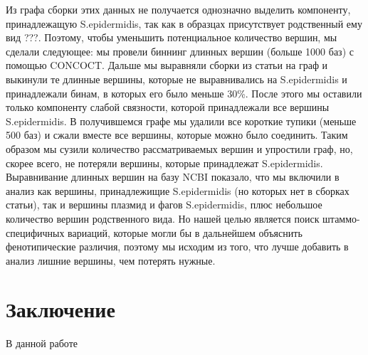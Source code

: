 \documentclass{spbau-diploma}
\begin{document}
Из графа сборки этих данных не получается однозначно выделить компоненту, принадлежащую S.epidermidis, так как в образцах присутствует родственный ему вид ???. Поэтому, чтобы уменьшить потенциальное количество вершин, мы сделали следующее: мы провели биннинг длинных вершин (больше 1000 баз) с помощью CONCOCT. Дальше мы выравняли сборки из статьи на граф и выкинули те длинные вершины, которые не выравнивались на S.epidermidis и принадлежали бинам, в которых его было меньше 30\%. После этого мы оставили только компоненту слабой связности, которой принадлежали все вершины S.epidermidis. В получившемся графе мы удалили все короткие тупики (меньше 500 баз) и сжали вместе все вершины, которые можно было соединить. Таким образом мы сузили количество рассматриваемых вершин и упростили граф, но, скорее всего, не потеряли вершины, которые принадлежат S.epidermidis. Выравнивание длинных вершин на базу NCBI показало, что мы включили в анализ как вершины, принадлежищие S.epidermidis (но которых нет в сборках статьи), так и вершины плазмид и фагов S.epidermidis, плюс небольшое количество вершин родственного вида. Но нашей целью является поиск штаммо-специфичных вариаций, которые могли бы в дальнейшем объяснить фенотипические различия, поэтому мы исходим из того, что лучше добавить в анализ лишние вершины, чем потерять нужные.




\section*{Заключение}
В данной работе








\end{document}
